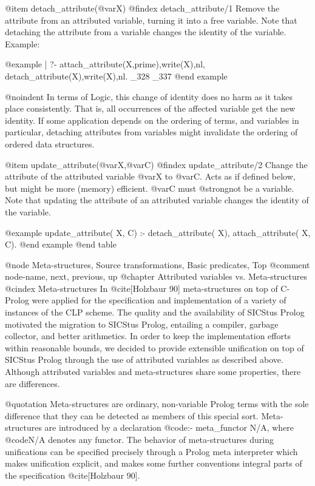 @item detach_attribute(@var{X})
@findex detach_attribute/1
Remove the attribute from an attributed variable, turning it into a free
variable. Note that detaching the attribute from a variable changes the
identity of the variable. Example:

@example
| ?- attach_attribute(X,prime),write(X),nl,
     detach_attribute(X),write(X),nl.
_328
_337
@end example

@noindent
In terms of Logic, this change of identity does no harm as it takes
place consistently. That is, all occurrences of the affected variable get
the new identity. If some application depends on the ordering of terms,
and variables in particular, detaching attributes from variables might
invalidate the ordering of ordered data structures.


@item update_attribute(@var{X},@var{C})
@findex update_attribute/2
Change the attribute of the attributed variable @var{X} to @var{C}.
Acts as if defined below, but might be more (memory) efficient. @var{C}
must @strong{not} be a variable. Note that updating the attribute of an
attributed variable changes the identity of the variable.

@example
update_attribute( X, C) :-
  detach_attribute( X),
  attach_attribute( X, C).
@end example
@end table

@node Meta-structures, Source transformations, Basic predicates, Top
@comment  node-name,  next,  previous,  up
@chapter Attributed variables vs. Meta-structures
@cindex Meta-structures
In @cite{[Holzbaur 90]} meta-structures on top of C-Prolog were applied
for the specification and implementation of a variety of instances of
the CLP scheme. The quality and the availability of SICStus Prolog
motivated the migration to SICStus Prolog, entailing a compiler, garbage
collector, and better arithmetics. In order to keep the implementation
efforts within reasonable bounds, we decided to provide extensible
unification on top of SICStus Prolog through the use of attributed
variables as described above.  Although attributed variables and
meta-structures share some properties, there are differences.

@quotation
Meta-structures are ordinary, non-variable Prolog terms with the sole
difference that they can be detected as members of this special sort.
Meta-structures are introduced by a declaration @code{:- meta_functor
N/A}, where @code{N/A} denotes any functor.  The behavior of
meta-structures during unifications can be specified precisely through a
Prolog meta interpreter which makes unification explicit, and makes some
further conventions integral parts of the specification @cite{[Holzbaur
90]}.

